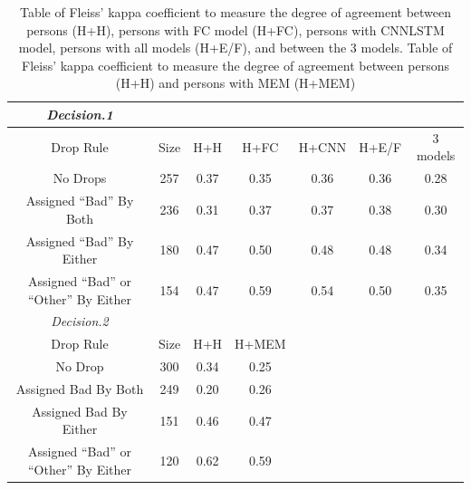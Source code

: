 \documentclass[runningheads,a4paper]{llncs}
\begin{document}

\begin{table}[h!]
  \begin{tabular}{|c | c | c | c | c | c | c|} 
  \hline
  \emph{Decision.1}\\
  \hline
  Drop Rule & Size & H+H & H+FC & H+CNN & H+E/F & 3 models \\ [0.5ex] 
  \hline
  No Drops & 257 &0.37 & 0.35 & 0.36 & 0.36 & 0.28\\ 
  \hline
  Assigned \enquote{Bad} By Both & 236 & 0.31 & 0.37 & 0.37 & 0.38 & 0.30 \\
  \hline
  Assigned \enquote{Bad} By Either & 180 & 0.47 & 0.50 & 0.48 & 0.48 &  0.34 \\
  \hline
  Assigned \enquote{Bad} or \enquote{Other} By Either & 154 & 0.47 & 0.59 & 0.54 & 0.50 &  0.35 \\
  \hline
  \emph{Decision.2}\\
  \hline
  Drop Rule & Size & H+H & H+MEM \\
  \hline
  No Drop & 300 & 0.34 & 0.25\\ 
  \hline
  Assigned Bad By Both & 249 & 0.20 & 0.26 \\
  \hline
  Assigned Bad By Either & 151 & 0.46 &  0.47 \\
  \hline
 Assigned \enquote{Bad} or \enquote{Other} By Either  & 120 & 0.62   &  0.59 \\
 \end{tabular}
 \caption{\label{kappa_table_TPE}Table of Fleiss' kappa coefficient to measure the degree of agreement between persons (H+H), persons with FC model (H+FC), persons with CNNLSTM model, persons with all models (H+E/F), and between the 3 models. 
 Table of Fleiss' kappa coefficient to measure the degree of agreement between persons (H+H) and persons with MEM (H+MEM)
 } %
 \end{table}
\end{document}
